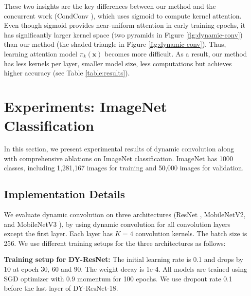 \documentclass[10pt,twocolumn,letterpaper]{article}
\begin{document}
These two insights are the key differences between our method and the concurrent work (CondConv \cite{Yang2019CondConvCP}), which uses sigmoid to compute kernel attention. Even though sigmoid provides near-uniform attention in early training epochs, it has significantly larger kernel space (two pyramids in Figure \ref{fig:dynamic-conv}) than our method (the shaded triangle in Figure \ref{fig:dynamic-conv}). Thus, learning attention model $\pi_k(\bm{x})$ becomes more difficult. As a result, our method has less kernels per layer, smaller model size, less computations but achieves higher accuracy (see Table \ref{table:results}). 


\section{Experiments: ImageNet Classification}
In this section, we present experimental results of dynamic convolution along with comprehensive ablations on ImageNet \cite{deng2009imagenet} classification. ImageNet has 1000 classes, including 1,281,167 images for training and 50,000 images for validation. 

\subsection{Implementation Details}
We evaluate dynamic convolution on three architectures (ResNet \cite{he2016deep}, MobileNetV2\cite{sandler2018mobilenetv2}, and MobileNetV3 \cite{howard2019mbnetv3}), by using dynamic convolution for all convolution layers except the first layer. Each layer has $K=4$ convolution kernels. The batch size is 256. We use different training setups for the three architectures as follows:

\noindent \textbf{Training setup for DY-ResNet:} The initial learning rate is 0.1 and drops by 10 at epoch 30, 60 and 90. The weight decay is 1e-4. All models are trained using SGD optimizer with 0.9 momentum for 100 epochs. We use dropout rate 0.1 before the last layer of DY-ResNet-18.
\end{document}
